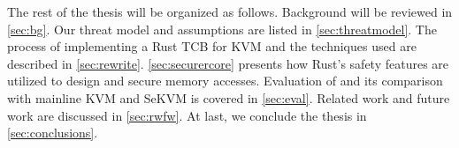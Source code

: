 



The rest of the thesis will be organized as follows. Background
will be reviewed in \autoref{sec:bg}. Our threat model and assumptions are
listed in \autoref{sec:threatmodel}. The process of implementing a Rust TCB
for KVM and the techniques used are described in \autoref{sec:rewrite}.
\autoref{sec:securercore} presents how Rust's safety features are utilized to
design and secure \rustcore{} memory accesses.
Evaluation of \rustsec{} and its comparison with mainline KVM and SeKVM is
covered in \autoref{sec:eval}. Related work and future work are discussed in
\autoref{sec:rwfw}. At last, we conclude the thesis in
\autoref{sec:conclusions}.
